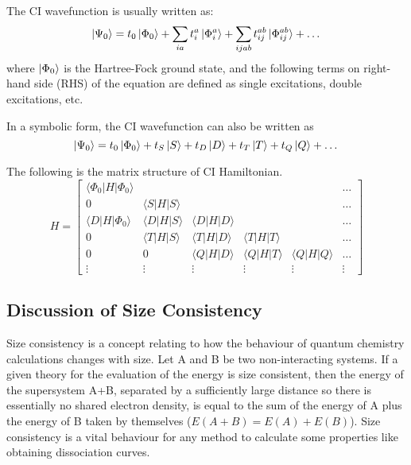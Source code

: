 The CI wavefunction is usually written as:
\begin{equation}
\ket{\Psi_0}=t_0 \ket{\Phi_0} + \sum_{ia} t^{a}_{i}\ket{\Phi^{a}_{i}}+\sum_{ijab}t^{ab}_{ij}\ket{\Phi^{ab}_{ij}}+ \dots
\end{equation}
where $\ket{\Phi_0}$ is the Hartree-Fock ground state, and the following terms on right-hand side (RHS) of the equation are defined as single excitations, double excitations, etc.

In a symbolic form, the CI wavefunction can also be written as
\begin{equation} \label{CIexcite}
	\ket{\Psi_0}=t_0\ket{\Phi_0}+t_S\ket{S}+t_D\ket{D}+t_T\ket{T}+t_Q\ket{Q}+\dots
\end{equation}

The following is the matrix structure of CI Hamiltonian.
\begin{equation}
H=
\left[ 
\begin{array}{cccccc}
	\langle\Phi_{0}|H| \Phi_{0} \rangle & & & & & \dots
	\\ 
	0 & \langle S|H| S\rangle & & & & \dots
	\\
	\langle D|H| \Phi_{0} \rangle & \langle D|H| S\rangle & \langle D|H| D\rangle & & & \dots
	\\
	0 & \langle T|H| S\rangle & \langle T|H| D\rangle & \langle T|H| T\rangle & & \dots
	\\
	0 & 0 & \langle Q|H| D\rangle & \langle Q|H| T\rangle & \langle Q|H| Q\rangle & \dots
	\\
	{\vdots} & {\vdots} & {\vdots} & {\vdots} & {\vdots} & {\vdots}
\end{array}
\right]
\end{equation}

\subsection{Discussion of Size Consistency}
Size consistency is a concept relating to how the behaviour of quantum chemistry calculations changes with size. \cite{sizeconsistency}
Let A and B be two non-interacting systems.
If a given theory for the evaluation of the energy is size consistent, then the energy of the supersystem A+B, separated by a sufficiently large distance so there is essentially no shared electron density, is equal to the sum of the energy of A plus the energy of B taken by themselves ($E(A+B)=E(A)+E(B)$).
Size consistency is a vital behaviour for any method to calculate some properties like obtaining dissociation curves.

